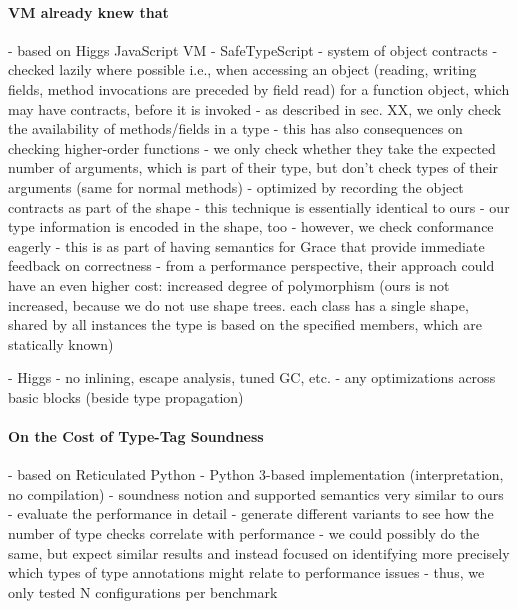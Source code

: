  




\paragraph{VM already knew that}

\begin{cnote}
- based on Higgs JavaScript VM
- SafeTypeScript
  - system of object contracts
  - checked lazily where possible
    i.e., when accessing an object (reading, writing fields, method invocations are preceded by field read)
    for a function object, which may have contracts, before it is invoked
  - as described in sec. XX, we only check the availability of methods/fields
    in a type
    - this has also consequences on checking higher-order functions
      - we only check whether they take the expected number of arguments,
        which is part of their type, but don't check types of their arguments
        (same for normal methods)
  - optimized by recording the object contracts as part of the shape
  - this technique is essentially identical to ours
    - our type information is encoded in the shape, too
    - however, we check conformance eagerly
      - this is as part of having semantics for Grace that provide immediate
        feedback on correctness
    - from a performance perspective, their approach could have an even higher
      cost: increased degree of polymorphism (ours is not increased,
      because we do not use shape trees.
      each class has a single shape, shared by all instances
      the type is based on the specified members, which are statically known)

- Higgs
  - no inlining, escape analysis, tuned GC, etc.
  - any optimizations across basic blocks (beside type propagation)

\end{cnote}


\paragraph{On the Cost of Type-Tag Soundness}
\begin{cnote}
- based on Reticulated Python
  - Python 3-based implementation (interpretation, no compilation)
- soundness notion and supported semantics very similar to ours
- evaluate the performance in detail
 - generate different variants to see how the number of type checks correlate
   with performance
 - we could possibly do the same, but expect similar results and instead
   focused on identifying more precisely which types of type annotations
   might relate to performance issues
   - thus, we only tested N configurations per benchmark
\end{cnote}

